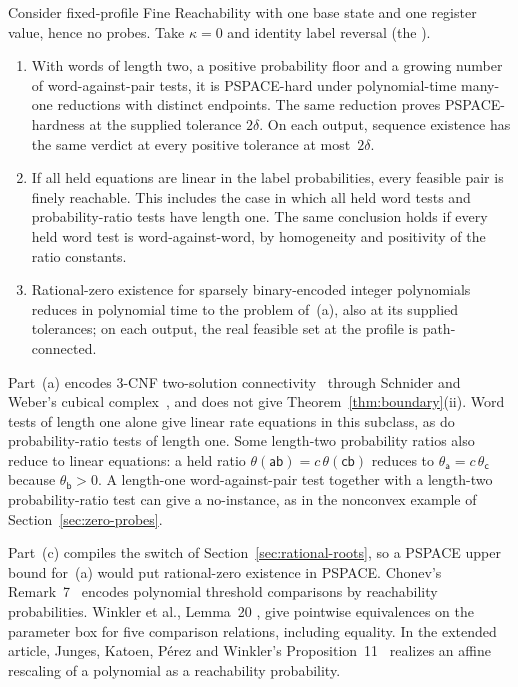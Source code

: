 \begin{proposition}\label{prop:one-state}
Consider fixed-profile Fine Reachability with one base state and one
register value, hence no probes. Take $\kappa=0$ and identity label
reversal (the ).
\begin{enumerate}
\item[(a)] With words of length two, a positive probability floor and a
growing number of word-against-pair tests, it is PSPACE-hard under
polynomial-time many-one reductions with distinct endpoints. %
The same reduction proves PSPACE-hardness at the supplied tolerance
$2\delta$. On each output, sequence existence has the same verdict at
every positive tolerance at most~$2\delta$.
\item[(b)] If all held equations are linear in the label probabilities,
every feasible pair is finely reachable. This includes the case in which
all held word tests and probability-ratio tests have length one. The same
conclusion holds if every held word test is word-against-word, by
homogeneity and positivity of the ratio constants.
\item[(c)] Rational-zero existence for sparsely binary-encoded integer
polynomials reduces in polynomial time to the problem of~(a), also at its
supplied tolerances; on each output, the real feasible set at the profile
is path-connected.
\end{enumerate}
\end{proposition}

Part~(a) encodes 3-CNF two-solution
connectivity~\cite[Lemma~3.6]{gopalan} through Schnider and Weber's
cubical complex~\cite[Definition~4]{schniderweber}, and does not give
Theorem~\ref{thm:boundary}(ii).
Word tests of length one alone give linear rate equations in this
subclass, as do probability-ratio tests of length one. Some length-two
probability ratios also reduce to linear equations: a held ratio
$\theta(\mathsf{ab})=c\,\theta(\mathsf{cb})$ reduces to
$\theta_{\mathsf a}=c\,\theta_{\mathsf c}$ because
$\theta_{\mathsf b}>0$.
A length-one word-against-pair test together with a length-two
probability-ratio test can give a no-instance, as in the nonconvex example
of Section~\ref{sec:zero-probes}.

Part~(c) compiles the switch of Section~\ref{sec:rational-roots}, so a
PSPACE upper bound for~(a) would put rational-zero existence in PSPACE.
Chonev's Remark~7~\cite{chonev} encodes polynomial threshold comparisons by
reachability probabilities. Winkler et al., Lemma~20
\cite{winklerjungesperezkatoen}, give pointwise equivalences on the
parameter box for five comparison relations, including equality. In the
extended article, Junges, Katoen, Pérez and Winkler's
Proposition~11~\cite{jungeskatoenperezwinkler} realizes an affine
rescaling of a polynomial as a reachability probability.
